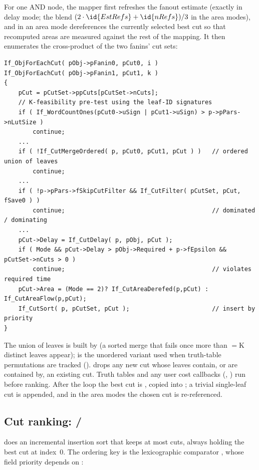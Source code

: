 For one AND node, the mapper first refreshes the fanout estimate 
(exactly  in delay mode; the blend $(2\cdot\id{EstRefs}+\id{nRefs})/3$
in the area modes), and in an area mode dereferences the currently selected best
cut so that recomputed areas are measured against the rest of the mapping. It
then enumerates the cross-product of the two fanins' cut sets:

\begin{lstlisting}[style=abccode]
If_ObjForEachCut( pObj->pFanin0, pCut0, i )
If_ObjForEachCut( pObj->pFanin1, pCut1, k )
{
    pCut = pCutSet->ppCuts[pCutSet->nCuts];
    // K-feasibility pre-test using the leaf-ID signatures
    if ( If_WordCountOnes(pCut0->uSign | pCut1->uSign) > p->pPars->nLutSize )
        continue;
    ...
    if ( !If_CutMergeOrdered( p, pCut0, pCut1, pCut ) )   // ordered union of leaves
        continue;
    ...
    if ( !p->pPars->fSkipCutFilter && If_CutFilter( pCutSet, pCut, fSave0 ) )
        continue;                                         // dominated / dominating
    ...
    pCut->Delay = If_CutDelay( p, pObj, pCut );
    if ( Mode && pCut->Delay > pObj->Required + p->fEpsilon && pCutSet->nCuts > 0 )
        continue;                                         // violates required time
    pCut->Area = (Mode == 2)? If_CutAreaDerefed(p,pCut) : If_CutAreaFlow(p,pCut);
    If_CutSort( p, pCutSet, pCut );                       // insert by priority
}
\end{lstlisting}

The union of leaves is built by  (a sorted merge that
fails once more than $=$K distinct leaves appear);  is
the unordered variant used when truth-table permutations are tracked
().  drops any new cut whose leaves contain, or
are contained by, an existing cut. Truth tables and any user cost callbacks
(, ) run before ranking. After the loop the best cut
is , copied into ; a trivial single-leaf cut is
appended, and in the area modes the chosen cut is re-referenced.

\subsection{Cut ranking:  / }

 does an incremental insertion sort that keeps at most
 cuts, always holding the best cut at index~0. The ordering key is
the lexicographic comparator , whose field priority
depends on :

